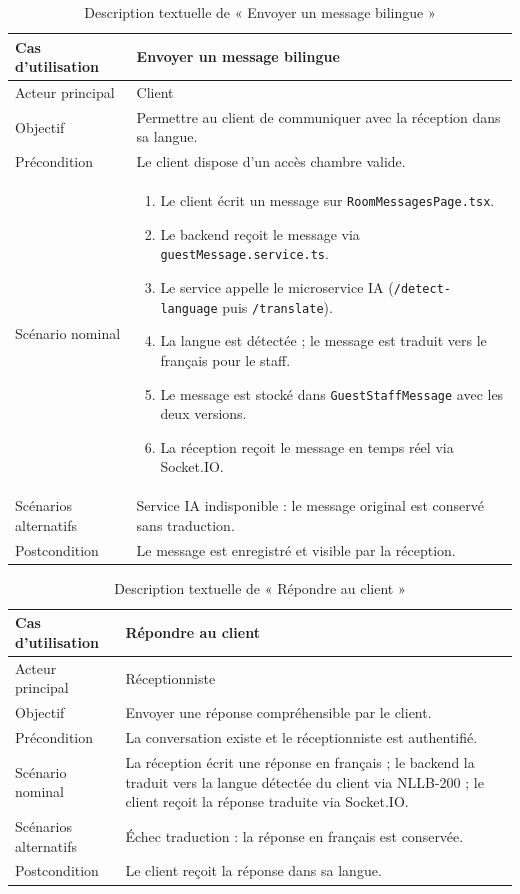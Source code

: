\begin{table}[H]
\centering
\caption{Description textuelle de « Envoyer un message bilingue »}
\small
\begin{tabularx}{\textwidth}{|p{3.5cm}|X|}
\hline
Cas d'utilisation & Envoyer un message bilingue \\ \hline
Acteur principal & Client \\ \hline
Objectif & Permettre au client de communiquer avec la réception dans sa langue. \\ \hline
Précondition & Le client dispose d'un accès chambre valide. \\ \hline
Scénario nominal &
\begin{enumerate}[nosep]
\item Le client écrit un message sur \texttt{RoomMessagesPage.tsx}.
\item Le backend reçoit le message via \texttt{guestMessage.service.ts}.
\item Le service appelle le microservice IA (\texttt{/detect-language} puis \texttt{/translate}).
\item La langue est détectée ; le message est traduit vers le français pour le staff.
\item Le message est stocké dans \texttt{GuestStaffMessage} avec les deux versions.
\item La réception reçoit le message en temps réel via Socket.IO.
\end{enumerate} \\ \hline
Scénarios alternatifs & Service IA indisponible : le message original est conservé sans traduction. \\ \hline
Postcondition & Le message est enregistré et visible par la réception. \\ \hline
\end{tabularx}
\end{table}

\begin{table}[H]
\centering
\caption{Description textuelle de « Répondre au client »}
\small
\begin{tabularx}{\textwidth}{|p{3.5cm}|X|}
\hline
Cas d'utilisation & Répondre au client \\ \hline
Acteur principal & Réceptionniste \\ \hline
Objectif & Envoyer une réponse compréhensible par le client. \\ \hline
Précondition & La conversation existe et le réceptionniste est authentifié. \\ \hline
Scénario nominal & La réception écrit une réponse en français ; le backend la traduit vers la langue détectée du client via NLLB-200 ; le client reçoit la réponse traduite via Socket.IO. \\ \hline
Scénarios alternatifs & Échec traduction : la réponse en français est conservée. \\ \hline
Postcondition & Le client reçoit la réponse dans sa langue. \\ \hline
\end{tabularx}
\end{table}

